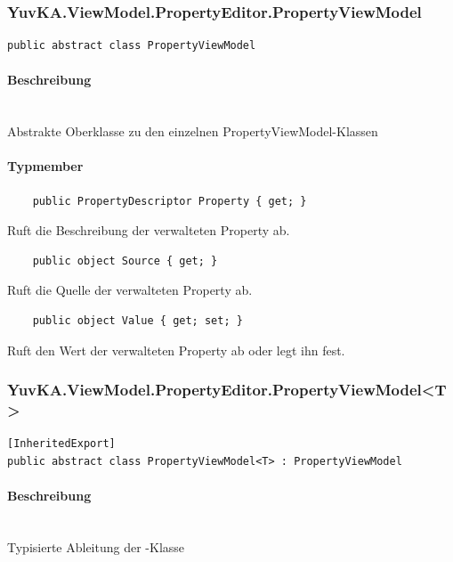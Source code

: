 \subsubsection{YuvKA.ViewModel.PropertyEditor.PropertyViewModel}

\begin{verbatim}
public abstract class PropertyViewModel
\end{verbatim}

\paragraph{Beschreibung}~\\
Abstrakte Oberklasse zu den einzelnen PropertyViewModel-Klassen

\paragraph{Typmember}
\begin{itemize}
 	
	\begin{verbatim}
	public PropertyDescriptor Property { get; }
	\end{verbatim}
	Ruft die Beschreibung der verwalteten Property ab.

	\begin{verbatim}
	public object Source { get; }
	\end{verbatim}
	Ruft die Quelle der verwalteten Property ab.

	\begin{verbatim}
	public object Value { get; set; }
	\end{verbatim}
	Ruft den Wert der verwalteten Property ab oder legt ihn fest.

\end{itemize}




\subsubsection{YuvKA.ViewModel.PropertyEditor.PropertyViewModel\textless T\textgreater}

\begin{verbatim}
[InheritedExport]
public abstract class PropertyViewModel<T> : PropertyViewModel
\end{verbatim}

\paragraph{Beschreibung}~\\
Typisierte Ableitung der -Klasse

